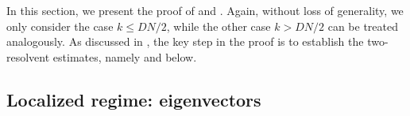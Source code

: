 \documentclass[10pt,reqno]{amsart}
\numberwithin{equation}{section}
\numberwithin{figure}{section}
\theoremstyle{plain} %
\theoremstyle{definition} %
\renewcommand{\txt}[1]{\text{\rm{#1}}}
\renewcommand{\leq}{\le}
\numberwithin{equation}{section}
\begin{document}
In this section, we present the proof of  and . Again, without loss of generality, we only consider the case $k\le DN/2$, while the other case $k> DN/2$ can be treated analogously. 
As discussed in , the key step in the proof is to establish the two-resolvent estimates, namely  and  below. 



\subsection{Localized regime: eigenvectors}
\end{document}
